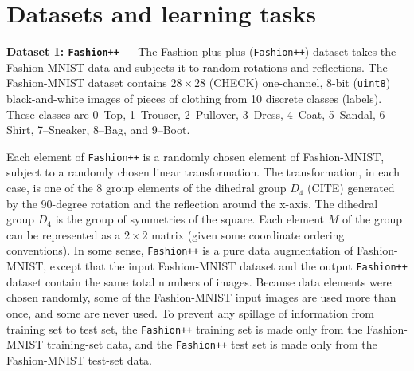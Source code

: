 \documentclass{article}
\renewcommand{\paragraph}[1]{\par\medskip\noindent\textbf{#1} ---}
\begin{document}
\section{Datasets and learning tasks}

\paragraph{Dataset 1: \texttt{Fashion++}}
The Fashion-plus-plus (\texttt{Fashion++}) dataset takes the Fashion-MNIST data \cite{fashion} and subjects it to random rotations and reflections.
The Fashion-MNIST dataset contains $28\times 28$ (CHECK) one-channel, 8-bit (\texttt{uint8}) black-and-white images of pieces of clothing from 10 discrete classes (labels).
These classes are 0--Top, 1--Trouser, 2--Pullover, 3--Dress, 4--Coat, 5--Sandal, 6--Shirt, 7--Sneaker, 8--Bag, and 9--Boot.

Each element of \texttt{Fashion++} is a randomly chosen element of Fashion-MNIST, subject to a randomly chosen linear transformation.
The transformation, in each case, is one of the 8 group elements of the dihedral group $D_4$ (CITE) generated by the 90-degree rotation and the reflection around the x-axis.
The dihedral group $D_4$ is the group of symmetries of the square.
Each element $M$ of the group can be represented as a $2\times 2$ matrix (given some coordinate ordering conventions).
In some sense, \texttt{Fashion++} is a pure data augmentation of Fashion-MNIST, except that the input Fashion-MNIST dataset and the output \texttt{Fashion++} dataset contain the same total numbers of images.
Because data elements were chosen randomly, some of the Fashion-MNIST input images are used more than once, and some are never used.
To prevent any spillage of information from training set to test set, the \texttt{Fashion++} training set is made only from the Fashion-MNIST training-set data, and the \texttt{Fashion++} test set is made only from the Fashion-MNIST test-set data. 
\end{document}

